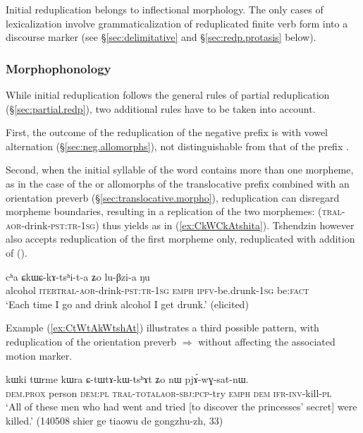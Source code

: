 Initial reduplication belongs to inflectional morphology. The only cases of lexicalization involve grammaticalization of reduplicated finite verb form into a discourse marker  (see §\ref{sec:delimitative} and §\ref{sec:redp.protasis} below).
 
 \subsubsection{Morphophonology} \label{sec:initial.redp.morpho}
While initial reduplication follows the general rules of partial reduplication (§\ref{sec:partial.redp}), two additional rules have to be taken into account. 

First, the outcome of the reduplication of the negative prefix  is  with vowel alternation (§\ref{sec:neg.allomorphs}), not distinguishable from that of the prefix .

Second, when the initial syllable of the word contains more than one morpheme, as in the case of the  or  allomorphs of the translocative prefix combined with an orientation preverb (§\ref{sec:translocative.morpho}), reduplication can disregard morpheme boundaries, resulting in a replication of the  two morphemes:  (\textsc{tral}-\textsc{aor}-drink-\textsc{pst}:\textsc{tr}-\textsc{1sg}) thus yields  as in  (\ref{ex:CkWCkAtshita}). Tshendzin however also accepts reduplication of the first morpheme only, reduplicated with addition of   ().
 
\begin{exe}
\ex \label{ex:CkWCkAtshita}
\gll cʰa ɕkɯ\redp{}ɕ-kɤ-tsʰi-t-a ʑo lu-βzi-a ŋu \\
alcohol \textsc{iter}\redp{}\textsc{tral}-\textsc{aor}-drink-\textsc{pst}:\textsc{tr}-\textsc{1sg} \textsc{emph} \textsc{ipfv}-be.drunk-\textsc{1sg} be:\textsc{fact} \\
\glt `Each time I go and drink alcohol I get drunk.' (elicited)
\end{exe}

Example (\ref{ex:CtWtAkWtshAt}) illustrates a third possible pattern, with reduplication of the orientation preverb  $\Rightarrow$  without affecting the associated motion marker.

\begin{exe}
\ex \label{ex:CtWtAkWtshAt}
\gll kɯki tɯrme kɯra ɕ-tɯ\redp{}tɤ-kɯ-tsʰɤt ʑo nɯ pjɤ́-wɣ-sat-nɯ. \\
\textsc{dem}.\textsc{prox} person \textsc{dem}:\textsc{pl} \textsc{tral}-\textsc{total}\redp{}\textsc{aor}-\textsc{sbj}:\textsc{pcp}-try \textsc{emph} \textsc{dem} \textsc{ifr}-\textsc{inv}-kill-\textsc{pl} \\
\glt `All of these men who had went and tried [to discover the princesses' secret] were killed.' (140508 shier ge tiaowu de gongzhu-zh, 33)
\end{exe}

